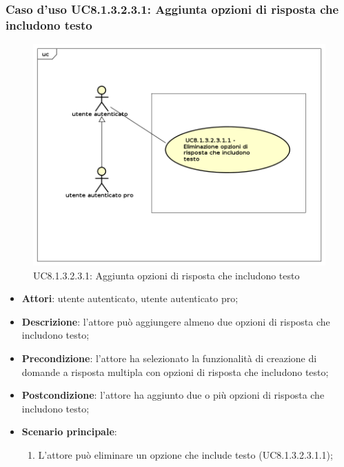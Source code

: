 \subsubsection{Caso d'uso UC8.1.3.2.3.1: Aggiunta opzioni di risposta che includono testo}
	\label{UC8.1.3.2.3.1}
	\begin{figure}[h]
		\centering
			\includegraphics[scale=0.45,keepaspectratio]{UML/UC8_1_3_2_3_1.png}
		\caption{UC8.1.3.2.3.1: Aggiunta opzioni di risposta che includono testo}
	\end{figure}	
	\FloatBarrier
	\begin{itemize}
		\item
			\textbf{Attori}: utente autenticato, utente autenticato pro;
		\item		
			\textbf{Descrizione}: l'attore può aggiungere almeno due opzioni di risposta che includono testo;
		\item
			\textbf{Precondizione}: l'attore ha selezionato la funzionalità di creazione di domande a risposta multipla con opzioni di risposta che includono testo; 
		\item
			\textbf{Postcondizione}: l'attore ha aggiunto due o più opzioni di risposta che includono testo;
		\item
			\textbf{Scenario principale}: 
				\begin{enumerate}
					\item
						L'attore può eliminare un opzione che include testo (UC8.1.3.2.3.1.1); 				
				\end{enumerate}
	\end{itemize}	
	
